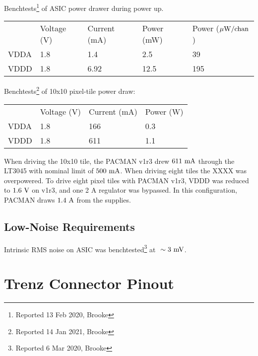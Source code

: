\documentclass[12pt]{article}
\begin{document}
Benchtests\footnote{Reported 13 Feb 2020, Brooke} of ASIC power drawer during power up.
\begin{center}
\begin{tabular}{lllll}
   & Voltage (V) & Current (mA) & Power (mW) & Power ($\rm \mu W / chan$)\\
VDDA  & 1.8 & 1.4  & 2.5  & 39\\
VDDD  & 1.8 & 6.92 & 12.5 & 195\\
\end{tabular}
\end{center}

Benchtests\footnote{Reported 14 Jan 2021, Brooke} of 10x10 pixel-tile power draw:
\begin{center}
\begin{tabular}{llll}
   & Voltage (V) & Current (mA) & Power (W) \\
VDDA  & 1.8 & 166  & 0.3  \\
VDDD  & 1.8 & {\color{red} 611}  & 1.1  \\
\end{tabular}
\end{center}

When driving the 10x10 tile, the PACMAN v1r3 drew $611~\rm mA$ through
the LT3045 with nominal limit of $500~\rm mA$.  When driving eight tiles the XXXX was overpowered.  To drive eight pixel tiles with PACMAN v1r3, VDDD was reduced to $1.6~\rm V$ on v1r3, and one 2 A regulator was bypassed.  In this configuration, PACMAN draws $1.4~\rm A$ from the supplies.


\subsection{Low-Noise Requirements}

Intrinsic RMS noise on ASIC was benchtested\footnote{Reported 6 Mar
  2020, Brooke} at $~\sim 3~\rm mV$.


\appendix

\newpage
\section{Trenz Connector Pinout}
\label{app:bigpinout}
\end{document}
